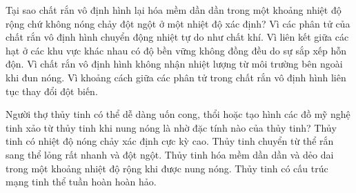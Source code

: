 \begin{ex}
Tại sao chất rắn vô định hình lại hóa mềm dần dần trong một khoảng nhiệt độ rộng chứ không nóng chảy đột ngột ở một nhiệt độ xác định?
\choice
{Vì các phân tử của chất rắn vô định hình chuyển động nhiệt tự do như chất khí.}
{\True Vì liên kết giữa các hạt ở các khu vực khác nhau có độ bền vững không đồng đều do sự sắp xếp hỗn độn.}
{Vì chất rắn vô định hình không nhận nhiệt lượng từ môi trường bên ngoài khi đun nóng.}
{Vì khoảng cách giữa các phân tử trong chất rắn vô định hình liên tục thay đổi đột biến.}
\end{ex}

\begin{ex}
Người thợ thủy tinh có thể dễ dàng uốn cong, thổi hoặc tạo hình các đồ mỹ nghệ tinh xảo từ thủy tinh khi nung nóng là nhờ đặc tính nào của thủy tinh?
\choice
{Thủy tinh có nhiệt độ nóng chảy xác định cực kỳ cao.}
{Thủy tinh chuyển từ thể rắn sang thể lỏng rất nhanh và đột ngột.}
{\True Thủy tinh hóa mềm dần dần và dẻo dai trong một khoảng nhiệt độ rộng khi được nung nóng.}
{Thủy tinh có cấu trúc mạng tinh thể tuần hoàn hoàn hảo.}
\end{ex}

